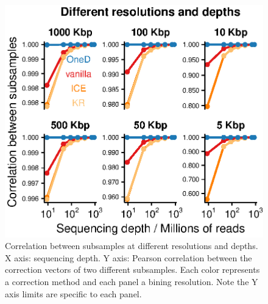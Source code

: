 \documentclass[12pt]{report}
\begin{document}
\begin{figure}
	\centerline{\includegraphics[width=\textwidth]{nar_figures/supp_figure_15.eps}}
    \caption{Correlation between subsamples at different resolutions and
    depths. X axis: sequencing depth. Y axis: Pearson correlation between the
    correction vectors of two different subsamples. Each color represents a
    correction method and each panel a bining resolution. Note the Y axis limits
    are specific to each panel.}
\end{figure}
\end{document}
